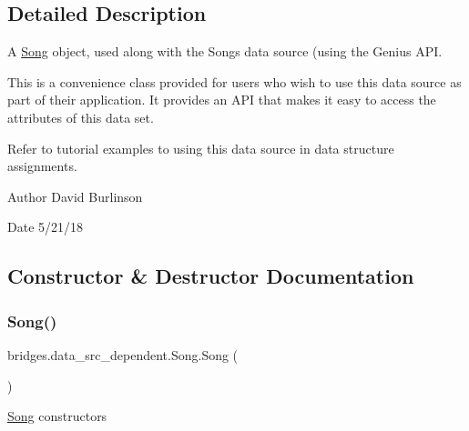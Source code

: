\subsection{Detailed Description}
A \mbox{\hyperlink{classbridges_1_1data__src__dependent_1_1_song}{Song}} object, used along with the Songs data source (using the Genius A\+PI. 

This is a convenience class provided for users who wish to use this data source as part of their application. It provides an A\+PI that makes it easy to access the attributes of this data set.

Refer to tutorial examples to using this data source in data structure assignments.

\begin{DoxyAuthor}{Author}
David Burlinson 
\end{DoxyAuthor}
\begin{DoxyDate}{Date}
5/21/18 
\end{DoxyDate}


\subsection{Constructor \& Destructor Documentation}
\mbox{\label{classbridges_1_1data__src__dependent_1_1_song_a824052caca0b9c03d07c42e9e7740020}} 
\subsubsection{\texorpdfstring{Song()}{Song()}\hspace{0.1cm}{\footnotesize\ttfamily [1/2]}}
{\footnotesize\ttfamily bridges.\+data\+\_\+src\+\_\+dependent.\+Song.\+Song (\begin{DoxyParamCaption}{ }\end{DoxyParamCaption})}

\mbox{\hyperlink{classbridges_1_1data__src__dependent_1_1_song}{Song}} constructors \mbox{\label{classbridges_1_1data__src__dependent_1_1_song_a78506e63f4d91dc1f0d821050a093ad6}} 
